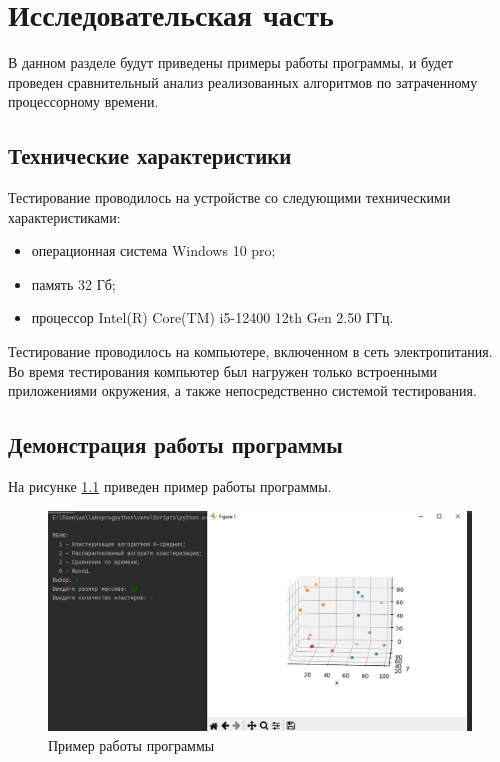 \chapter{Исследовательская часть}

В данном разделе будут приведены примеры работы программы, и будет проведен сравнительный анализ реализованных алгоритмов по затраченному процессорному времени.

\section{Технические характеристики}

Тестирование проводилось на устройстве со следующими техническими характеристиками:

\begin{itemize}
	\item операционная система Windows 10 pro;
	\item память 32 Гб;
	\item процессор Intel(R) Core(TM) i5-12400 12th Gen 2.50 ГГц.
\end{itemize}

Тестирование проводилось на компьютере, включенном в сеть электропитания. Во время тестирования компьютер был нагружен только встроенными приложениями окружения, а также непосредственно системой тестирования.

\clearpage

\section{Демонстрация работы программы}

На рисунке \ref{img:example} приведен пример работы программы.

\begin{figure}[H]
	\begin{center}
		\includegraphics[scale=0.5]{img/example.png}
	\end{center}
	\captionsetup{justification=centering}
	\caption{Пример работы программы}
	\label{img:example}
\end{figure}

